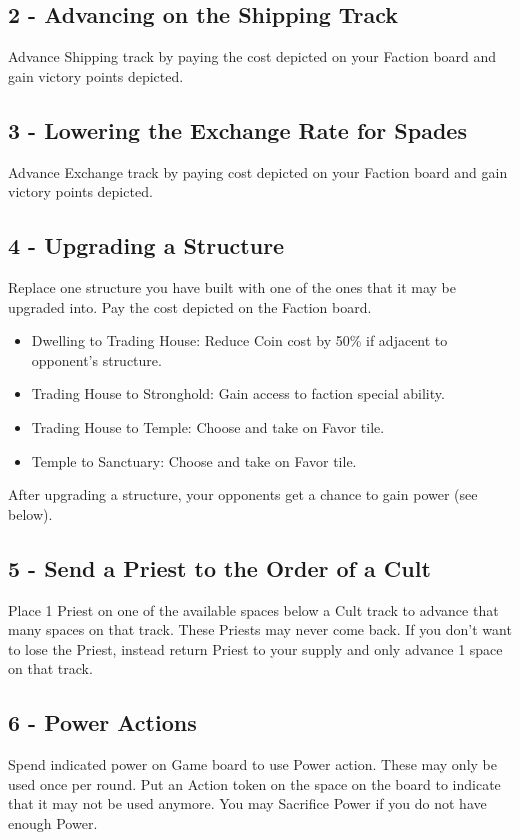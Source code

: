 \documentclass[12pt]{article}
\newenvironment{itemizeCustom}
{\begin{itemize}
  \setlength{\itemsep}{1pt}
  \setlength{\parskip}{0pt}
  \setlength{\parsep}{0pt}}
{\end{itemize}}
\begin{document}
\begin{multicols*}{2}
\subsection*{2 - Advancing on the Shipping Track}
Advance Shipping track by paying the cost depicted on your Faction board and gain victory points depicted.

\subsection*{3 - Lowering the Exchange Rate for Spades}
Advance Exchange track by paying cost depicted on your Faction board and gain victory points depicted.

\subsection*{4 - Upgrading a Structure}
Replace one structure you have built with one of the ones that it may be upgraded into. Pay the cost depicted on the Faction board.
\begin{itemizeCustom}
    \item Dwelling to Trading House: Reduce Coin cost by 50\% if adjacent to opponent's structure.
    \item Trading House to Stronghold: Gain access to faction special ability.
    \item Trading House to Temple: Choose and take on Favor tile.
    \item Temple to Sanctuary: Choose and take on Favor tile.
\end{itemizeCustom}

\noindent
After upgrading a structure, your opponents get a chance to gain power (see below).

\subsection*{5 - Send a Priest to the Order of a Cult}
Place 1 Priest on one of the available spaces below a Cult track to advance that many spaces on that track. These Priests may never come back. If you don't want to lose the Priest, instead return Priest to your supply and only advance 1 space on that track.

\subsection*{6 - Power Actions}
Spend indicated power on Game board to use Power action. These may only be used once per round. Put an Action token on the space on the board to indicate that it may not be used anymore. You may Sacrifice Power if you do not have enough Power.


\end{multicols*}
\end{document}
